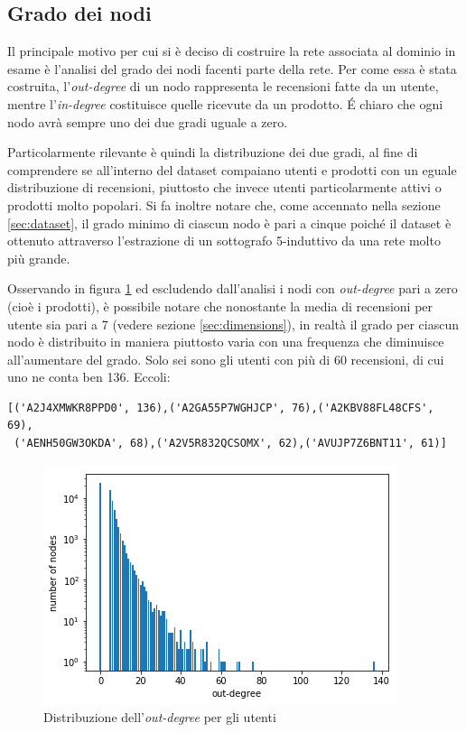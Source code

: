 \documentclass[hidelinks, 12pt]{article}
\begin{document}
\subsection{Grado dei nodi}
\label{sec:nodes-degree}

Il principale motivo per cui si è deciso di costruire la rete associata al dominio in esame è l'analisi del grado dei nodi facenti parte della rete. Per come essa è stata costruita, l'\textit{out-degree} di un nodo rappresenta le recensioni fatte da un utente, mentre l'\textit{in-degree} costituisce quelle ricevute da un prodotto. É chiaro che ogni nodo avrà sempre uno dei due gradi uguale a zero.

Particolarmente rilevante è quindi la distribuzione dei due gradi, al fine di comprendere se all'interno del dataset compaiano utenti e prodotti con un eguale distribuzione di recensioni, piuttosto che invece utenti particolarmente attivi o prodotti molto popolari. Si fa inoltre notare che, come accennato nella sezione \ref{sec:dataset}, il grado minimo di ciascun nodo è pari a cinque poiché il dataset è ottenuto attraverso l'estrazione di un sottografo 5-induttivo da una rete molto più grande.

Osservando in figura \ref{fig:out-degree} ed escludendo dall'analisi i nodi con \textit{out-degree} pari a zero (cioè i prodotti), è possibile notare che nonostante la media di recensioni per utente sia pari a 7 (vedere sezione \ref{sec:dimensions}), in realtà il grado per ciascun nodo è distribuito in maniera piuttosto varia con una frequenza che diminuisce all'aumentare del grado. Solo sei sono gli utenti con più di 60 recensioni, di cui uno ne conta ben 136. Eccoli:

\begin{verbatim}
[('A2J4XMWKR8PPD0', 136),('A2GA55P7WGHJCP', 76),('A2KBV88FL48CFS', 69),
 ('AENH50GW3OKDA', 68),('A2V5R832QCSOMX', 62),('AVUJP7Z6BNT11', 61)]
\end{verbatim}

\begin{figure}[H]
	\centering
	\includegraphics[scale=0.7]{images/03_04_out_degree.png}
	\caption[Distribuzione dell'\textit{out-degree} per gli utenti]{Distribuzione dell'\textit{out-degree} per gli utenti}
	\label{fig:out-degree}
\end{figure}
\end{document}
